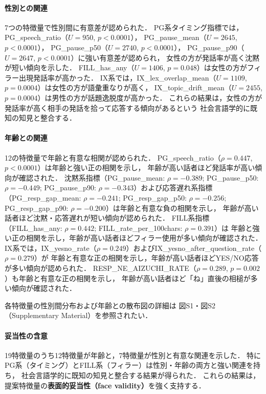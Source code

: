 \documentclass[dvipdfmx,11pt,a4paper]{bxjsarticle}
\begin{document}
\paragraph{性別との関連}
7つの特徴量で性別間に有意差が認められた．
PG系タイミング指標では，PG\_speech\_ratio（$U = 950$, $p < 0.0001$），
PG\_pause\_mean（$U = 2645$, $p < 0.0001$），
PG\_pause\_p50（$U = 2740$, $p < 0.0001$），
PG\_pause\_p90（$U = 2647$, $p < 0.0001$）に強い有意差が認められ，
女性の方が発話率が高く沈黙が短い傾向を示した．
FILL\_has\_any（$U = 1406$, $p = 0.048$）は女性の方がフィラー出現発話率が高かった．
IX系では，IX\_lex\_overlap\_mean（$U = 1109$, $p = 0.0004$）は女性の方が語彙重なりが高く，
IX\_topic\_drift\_mean（$U = 2455$, $p = 0.0004$）は男性の方が話題逸脱度が高かった．
これらの結果は，女性の方が発話率が高く相手の発話を拾って応答する傾向があるという
社会言語学的に既知の知見と整合する．

\paragraph{年齢との関連}
12の特徴量で年齢と有意な相関が認められた．
PG\_speech\_ratio（$\rho = 0.447$, $p < 0.0001$）は年齢と強い正の相関を示し，
年齢が高い話者ほど発話率が高い傾向が確認された．
沈黙系指標（PG\_pause\_mean: $\rho = -0.389$; PG\_pause\_p50: $\rho = -0.449$;
PG\_pause\_p90: $\rho = -0.343$）および応答遅れ系指標
（PG\_resp\_gap\_mean: $\rho = -0.241$; PG\_resp\_gap\_p50: $\rho = -0.256$;
PG\_resp\_gap\_p90: $\rho = -0.200$）は年齢と有意な負の相関を示し，
年齢が高い話者ほど沈黙・応答遅れが短い傾向が認められた．
FILL系指標（FILL\_has\_any: $\rho = 0.442$; FILL\_rate\_per\_100chars: $\rho = 0.391$）は
年齢と強い正の相関を示し，年齢が高い話者ほどフィラー使用が多い傾向が確認された．
IX系では，IX\_yesno\_rate（$\rho = 0.249$）およびIX\_yesno\_after\_question\_rate（$\rho = 0.279$）が
年齢と有意な正の相関を示し，年齢が高い話者ほどYES/NO応答が多い傾向が認められた．
RESP\_NE\_AIZUCHI\_RATE（$\rho = 0.289$, $p = 0.002$）も年齢と有意な正の相関を示し，
年齢が高い話者ほど「ね」直後の相槌が多い傾向が確認された．

各特徴量の性別間分布および年齢との散布図の詳細は
図S1・図S2（Supplementary Material）を参照されたい．

\paragraph{妥当性の含意}
19特徴量のうち12特徴量が年齢と，7特徴量が性別と有意な関連を示した．
特にPG系（タイミング）とFILL系（フィラー）は性別・年齢の両方と強い関連を持ち，
社会言語学的に既知の知見と整合する結果が得られた．
これらの結果は，提案特徴量の\textbf{表面的妥当性（face validity）}を強く支持する．
\end{document}
